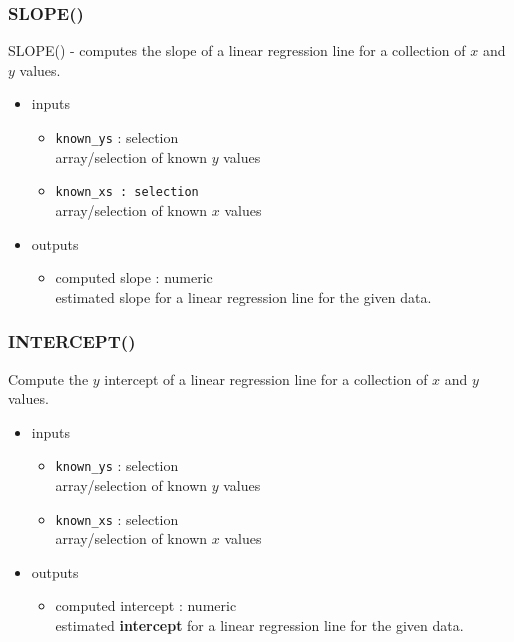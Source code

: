 \documentclass[12pt]{beamer}
\begin{document}
	\begin{frame}
		\frametitle{SLOPE()}
		SLOPE()  - computes the slope of a linear regression line for a collection of $x$ and $y$ values. 
		\begin{itemize}
			\item inputs 
				\begin{itemize}
					 \item \texttt{known\_ys} : selection \\ 
					 array/selection of known $y$ values
					 \item \texttt{known\_xs : selection} \\
					 array/selection of known $x$ values
				\end{itemize}
			\item outputs 
				\begin{itemize}
					\item computed slope : numeric\\
					estimated slope for a linear regression line for the given data.
				\end{itemize}
			\end{itemize}
	\end{frame}
	\begin{frame}
		\frametitle{INTERCEPT()}
		Compute the $y$ intercept of a linear regression line for a collection of $x$ and $y$ values. 
		\begin{itemize}
			\item inputs 
			\begin{itemize}
				\item \texttt{known\_ys} : selection \\ 
				array/selection of known $y$ values
				\item \texttt{known\_xs} : selection \\
				array/selection of known $x$ values
			\end{itemize}
			\item outputs 
			\begin{itemize}
				\item computed intercept : numeric\\
				estimated \textbf{intercept} for a linear regression line for the given data.
			\end{itemize}
		\end{itemize}
	\end{frame}
\end{document}
